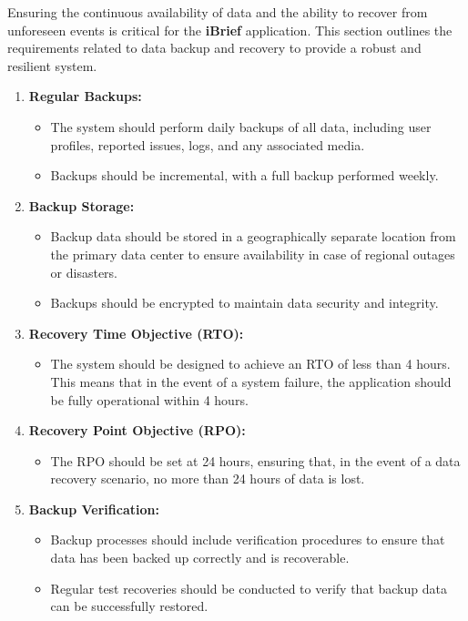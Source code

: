 Ensuring the continuous availability of data and the ability to recover from unforeseen events is critical for the \textbf{iBrief} application. This section outlines the requirements related to data backup and recovery to provide a robust and resilient system.

\begin{enumerate}
    \item \textbf{Regular Backups:}
    \begin{itemize}
        \item The system should perform daily backups of all data, including user profiles, reported issues, logs, and any associated media. 
        \item Backups should be incremental, with a full backup performed weekly.
    \end{itemize}
    
    \item \textbf{Backup Storage:}
    \begin{itemize}
        \item Backup data should be stored in a geographically separate location from the primary data center to ensure availability in case of regional outages or disasters.
        \item Backups should be encrypted to maintain data security and integrity.
    \end{itemize}
    
    \item \textbf{Recovery Time Objective (RTO):}
    \begin{itemize}
        \item The system should be designed to achieve an RTO of less than 4 hours. This means that in the event of a system failure, the application should be fully operational within 4 hours.
    \end{itemize}
    
    \item \textbf{Recovery Point Objective (RPO):}
    \begin{itemize}
        \item The RPO should be set at 24 hours, ensuring that, in the event of a data recovery scenario, no more than 24 hours of data is lost.
    \end{itemize}

    \item \textbf{Backup Verification:}
    \begin{itemize}
        \item Backup processes should include verification procedures to ensure that data has been backed up correctly and is recoverable.
        \item Regular test recoveries should be conducted to verify that backup data can be successfully restored.
    \end{itemize}


\end{enumerate}
